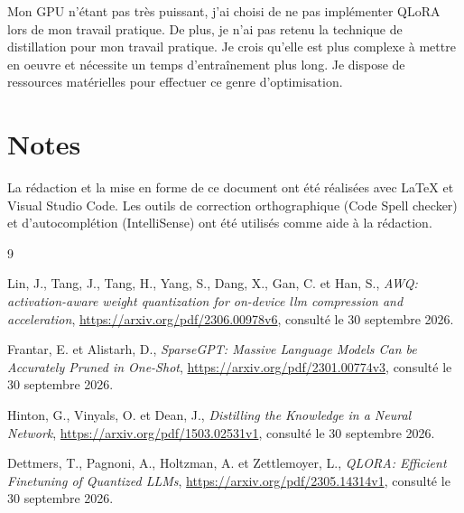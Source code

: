 \documentclass[12pt,a4paper]{report}
\begin{document}
Mon GPU n'étant pas très puissant, j'ai choisi de ne pas implémenter QLoRA lors de mon travail pratique. De plus,
je n'ai pas retenu la technique de distillation pour mon travail pratique. Je crois qu'elle est plus complexe 
à mettre en oeuvre et nécessite un temps d'entraînement plus long. Je dispose de ressources matérielles pour effectuer
ce genre d'optimisation.


\section*{Notes}
La rédaction et la mise en forme de ce document ont été réalisées avec \LaTeX{} et 
Visual Studio Code. Les outils de correction orthographique (Code Spell checker) et d'autocomplétion 
(IntelliSense) ont été utilisés comme aide à la rédaction.


\begin{thebibliography}{9}

Lin, J., Tang, J., Tang, H., Yang, S., Dang, X., Gan, C. et Han, S.,
\textit{AWQ: activation-aware weight quantization for on-device llm compression and acceleration},
\url{https://arxiv.org/pdf/2306.00978v6},
consulté le 30 septembre 2026.

Frantar, E. et Alistarh, D.,
\textit{SparseGPT: Massive Language Models Can be Accurately Pruned in One-Shot},
\url{https://arxiv.org/pdf/2301.00774v3},
consulté le 30 septembre 2026.

Hinton, G., Vinyals, O. et Dean, J.,
\textit{Distilling the Knowledge in a Neural Network},
\url{https://arxiv.org/pdf/1503.02531v1},
consulté le 30 septembre 2026.

Dettmers, T., Pagnoni, A., Holtzman, A. et Zettlemoyer, L.,
\textit{QLORA: Efficient Finetuning of Quantized LLMs},
\url{https://arxiv.org/pdf/2305.14314v1},
consulté le 30 septembre 2026.

\end{thebibliography}
\end{document}
